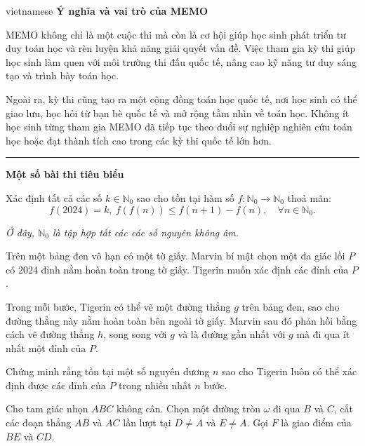 \documentclass{article}
\begin{document}
\begin{otherlanguage*}{vietnamese}
\textbf{Ý nghĩa và vai trò của MEMO}

MEMO không chỉ là một cuộc thi mà còn là cơ hội giúp học sinh phát triển tư duy toán học và rèn luyện khả năng giải quyết vấn đề.
Việc tham gia kỳ thi giúp học sinh làm quen với môi trường thi đấu quốc tế, nâng cao kỹ năng tư duy sáng tạo và trình bày toán học.

Ngoài ra, kỳ thi cũng tạo ra một cộng đồng toán học quốc tế, nơi học sinh có thể giao lưu, học hỏi từ bạn bè quốc tế và mở rộng tầm nhìn về toán học.
Không ít học sinh từng tham gia MEMO đã tiếp tục theo đuổi sự nghiệp nghiên cứu toán học hoặc đạt thành tích cao trong các kỳ thi quốc tế lớn hơn.

\bigbreak

\noindent\rule{16.5cm}{0.4pt}

\textbf{Một số bài thi tiêu biểu}

\bigbreak

\begin{problem*}[2024, bài 1]
    Xác định tất cả các số \( k \in \mathbb{N}_0 \) sao cho tồn tại hàm số \( f: \mathbb{N}_0 \to \mathbb{N}_0 \) thoả mãn:
    \[
        f(2024) = k,\ f(f(n)) \leq f(n+1) - f(n), \quad \forall n \in \mathbb{N}_0.
    \]
   
    \textit{Ở đây, \( \mathbb{N}_0 \) là tập hợp tất các các số nguyên không âm.}
\end{problem*}

\begin{problem*}[2024, bài 2]
    Trên một bảng đen vô hạn có một tờ giấy. Marvin bí mật chọn một đa giác lồi \( P \) có 2024 đỉnh nằm hoàn toàn trong tờ giấy. Tigerin muốn xác định các đỉnh của \( P \).  
    
    Trong mỗi bước, Tigerin có thể vẽ một đường thẳng \( g \) trên bảng đen, sao cho đường thẳng này nằm hoàn toàn bên ngoài tờ giấy.
    Marvin sau đó phản hồi bằng cách vẽ đường thẳng \( h \), song song với \( g \) và là đường gần nhất với \( g \) mà đi qua ít nhất một đỉnh của \( P \).  
    
    Chứng minh rằng tồn tại một số nguyên dương \( n \) sao cho Tigerin luôn có thể xác định được các đỉnh của \( P \) trong nhiều nhất \( n \) bước.
\end{problem*}

\begin{problem*}[2024, bài 3]
    Cho tam giác nhọn \( ABC \) không cân. Chọn một đường tròn \( \omega \) đi qua \( B \) và \( C \),
    cắt các đoạn thẳng \( AB \) và \( AC \) lần lượt tại \( D \neq A \) và \( E \neq A \). Gọi \( F \) là giao điểm của \( BE \) và \( CD \).  
    

\end{problem*}
\end{otherlanguage*}
\end{document}
